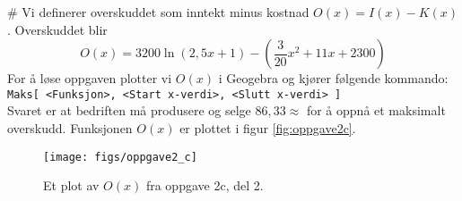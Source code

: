 \begin{easylist}[enumerate]
	# Vi definerer overskuddet som inntekt minus kostnad $O(x) = I(x) - K(x)$. Overskuddet blir
	\begin{equation*}
		O(x) = 3200 \ln \left(2,5x + 1\right) - \left( \frac{3}{20}x^2 + 11x + 2300 \right)
	\end{equation*}
	For å løse oppgaven plotter vi $O(x)$ i Geogebra og kjører følgende kommando: \\
	\texttt{Maks[ <Funksjon>, <Start x-verdi>, <Slutt x-verdi> ]}\\
	Svaret er at bedriften må produsere og selge $86,33 \approx$  for å oppnå et maksimalt overskudd.
	Funksjonen $O(x)$ er plottet i figur \eqref{fig:oppgave2c}.
\begin{figure}[th!]
	\centering
	\texttt{[image: figs/oppgave2\_c]}
	\caption{Et plot av $O(x)$ fra oppgave 2c, del 2.}
	\label{fig:oppgave2c}
\end{figure}
\end{easylist}

